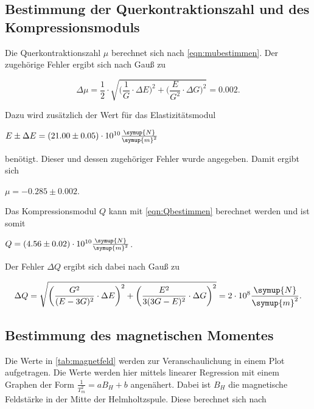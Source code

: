 \subsection{Bestimmung der Querkontraktionszahl und des Kompressionsmoduls}

Die Querkontraktionszahl $\mu$ berechnet sich nach \eqref{eqn:mubestimmen}. Der zugehörige Fehler ergibt sich nach Gauß zu

\begin{equation}
  \Delta \mu = \frac{1}{2} \cdot \sqrt{ \bigg( \frac{1}{G} \cdot \Delta E \bigg)^2 + \bigg( \frac{E}{G^2} \cdot \Delta G \bigg)^2} = 0.002.
\end{equation}

Dazu wird zusätzlich der Wert für das Elastizitätsmodul 

\vspace{.5em}
\centerline{$E \pm \Delta E = (21.00 \pm 0.05) \cdot 10^{10} \frac{\symup{N}}{\symup{m}^2}$}
\vspace{.5em}

benötigt. Dieser und dessen zugehöriger Fehler wurde angegeben. Damit ergibt sich 

\centerline{$\mu = -0.285 \pm 0.002$.}
Das Kompressionsmodul $Q$ kann mit \eqref{eqn:Qbestimmen} berechnet werden und ist somit

\vspace{.5em}
\centerline{$Q = (4.56 \pm 0.02) \cdot 10^{10} \frac{\symup{N}}{\symup{m}^2}$.}
\vspace{.5em}

Der Fehler $\Delta Q$ ergibt sich dabei nach Gauß zu

\begin{equation}
  \Delta Q = \sqrt{ \bigg( \frac{G^2}{(E - 3G)^2} \cdot \Delta E \bigg)^2 + \bigg( \frac{E^2}{3(3G - E)^2} \cdot \Delta G \bigg)^2} = 2 \cdot 10^{8} \frac{\symup{N}}{\symup{m}^2}.
\end{equation}


\subsection{Bestimmung des magnetischen Momentes}



Die Werte in \autoref{tab:magnetfeld} werden zur Veranschaulichung in einem Plot aufgetragen. Die Werte werden hier mittels linearer Regression mit einem Graphen der Form $\frac{1}{T_m^2} = aB_H + b$ angenähert.
Dabei ist $B_H$ die magnetische Feldstärke in der Mitte der Helmholtzspule. Diese berechnet sich nach


